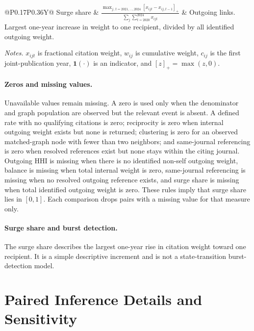\documentclass[12pt]{article}
\begin{document}
\begin{table}[p]
\begin{threeparttable}
\begin{tabularx}{\textwidth}{@{}P{0.17\textwidth}P{0.36\textwidth}Y@{}}
    \addlinespace
    Surge share
      & $\displaystyle
        \frac{\max_{j,\,t=2021,\ldots,2024}[x_{ijt}-x_{ij,t-1}]_+}
        {\sum_j\sum_{t=2020}^{2024}x_{ijt}}$
      & Outgoing links.  Largest one-year increase in weight to one recipient, divided by all identified outgoing weight. \\
    \bottomrule
  \end{tabularx}
  \begin{tablenotes}
    \item \textit{Notes.} $x_{ijt}$ is fractional citation weight, $w_{ij}$ is cumulative weight, $c_{ij}$ is the first joint-publication year, $\mathbf{1}(\cdot)$ is an indicator, and $[z]_+=\max(z,0)$.
  \end{tablenotes}
  \end{threeparttable}
\end{table}

\paragraph{Zeros and missing values.}  Unavailable values remain missing.  A zero is used only when the denominator and graph population are observed but the relevant event is absent.  A defined rate with no qualifying citations is zero; reciprocity is zero when internal outgoing weight exists but none is returned; clustering is zero for an observed matched-graph node with fewer than two neighbors; and same-journal referencing is zero when resolved references exist but none stays within the citing journal.  Outgoing HHI is missing when there is no identified non-self outgoing weight, balance is missing when total internal weight is zero, same-journal referencing is missing when no resolved outgoing reference exists, and surge share is missing when total identified outgoing weight is zero.  These rules imply that surge share lies in $[0,1]$.  Each comparison drops pairs with a missing value for that measure only.

\paragraph{Surge share and burst detection.}  The surge share describes the largest one-year rise in citation weight toward one recipient.  It is a simple descriptive increment and is not a state-transition burst-detection model.

\section{Paired Inference Details and Sensitivity}
\label{app:paired}
\end{document}
